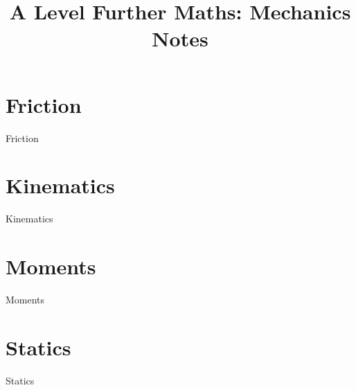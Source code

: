 \documentclass{report}
\title{A Level Further Maths: Mechanics Notes}
\date{ }
\begin{document}
    \maketitle
    \tableofcontents
    \newpage

	\chapter{Friction}
	{Friction}

	\chapter{Kinematics}
	{Kinematics}

	\chapter{Moments}
	{Moments}

	\chapter{Statics}
	{Statics}
\end{document}
